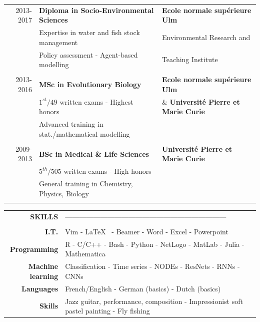 \documentclass[11pt, oneside]{article}   	%
\begin{document}
\begin{tabular}{rll}
2013-2017 & \textbf{Diploma in Socio-Environmental Sciences} & \textbf{Ecole normale supérieure Ulm} \\
& Expertise in water and fish stock management & Environmental Research and \\
& Policy assessment - Agent-based modelling &  Teaching Institute \\
\\
2013-2016 & \textbf{MSc in Evolutionary Biology} & \textbf{Ecole normale supérieure Ulm} \\
	& $1^{st}/49$ written exams - Highest honors  & \& \textbf{Université Pierre et Marie Curie} \\
 & Advanced training in stat./mathematical modelling & \\
 \\
2009-2013 & \textbf{BSc in Medical \& Life Sciences} & \textbf{Université Pierre et Marie Curie} \\
 & $5^{th}/505$ written exams - High honors  & \\
& General training in Chemistry, Physics, Biology & \\
\\
\end{tabular}

\hspace{-2.5cm}
\begin{tabular}{rll}
\textbf{SKILLS} & --------------------------------------------------------------------- &  \\
\\
\textbf{I.T.} & Vim - \LaTeX~ - Beamer - Word - Excel - Powerpoint & \\
\textbf{Programming} & R - C/C++ - Bash - Python - NetLogo - MatLab - Julia - Mathematica & \\
\textbf{Machine learning} & Classification - Time series - NODEs - ResNets - RNNs - CNNs & \\
\textbf{Languages} & French/English - German (basics) - Dutch (basics) & \\
\textbf{Skills} & Jazz guitar, performance, composition - Impressionist soft pastel painting - Fly fishing
\end{tabular}
\end{document}
